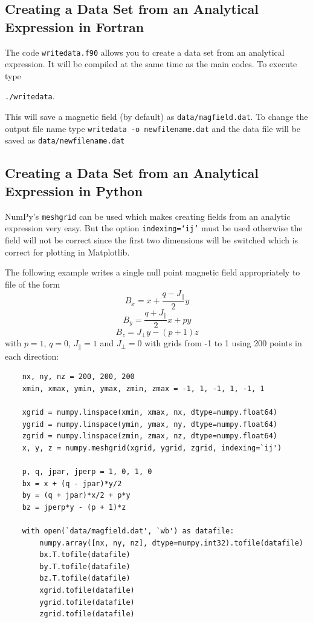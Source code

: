 \documentclass[12pt]{article}
\begin{document}
    \subsection{Creating a Data Set from an Analytical Expression in Fortran}
      \label{sec:writedata}

      The code \texttt{writedata.f90} allows you to create a data set from an analytical expression. It will be compiled at the same time as the main codes. To execute type

      \texttt{./writedata}.

      This will save a magnetic field (by default) as \texttt{data/magfield.dat}. To change the output file name type \texttt{writedata -o newfilename.dat} and the data file will be saved as \texttt{data/newfilename.dat}

    \subsection{Creating a Data Set from an Analytical Expression in Python}
      \label{sec:pythonanal}

      NumPy's \texttt{meshgrid} can be used which makes creating fields from an analytic expression very easy. But the option \texttt{indexing=`ij'} must be used otherwise the field will not be correct since the first two dimensions will be switched which is correct for plotting in Matplotlib.

      The following example writes a single null point magnetic field appropriately to file of the form
        \[ B_x = x + \frac{q - J_\parallel}{2} y \]
        \[ B_y = \frac{q + J_\parallel}{2} x + p y \]
        \[ B_z = J_\perp y - (p + 1) z \]
      with \( p = 1 \), \( q = 0 \), \( J_\parallel = 1 \) and \( J_\perp = 0 \) with grids from -1 to 1 using 200 points in each direction:

      \begin{verbatim}
    nx, ny, nz = 200, 200, 200
    xmin, xmax, ymin, ymax, zmin, zmax = -1, 1, -1, 1, -1, 1

    xgrid = numpy.linspace(xmin, xmax, nx, dtype=numpy.float64)
    ygrid = numpy.linspace(ymin, ymax, ny, dtype=numpy.float64)
    zgrid = numpy.linspace(zmin, zmax, nz, dtype=numpy.float64)
    x, y, z = numpy.meshgrid(xgrid, ygrid, zgrid, indexing=`ij')

    p, q, jpar, jperp = 1, 0, 1, 0
    bx = x + (q - jpar)*y/2
    by = (q + jpar)*x/2 + p*y
    bz = jperp*y - (p + 1)*z

    with open(`data/magfield.dat', `wb') as datafile:
        numpy.array([nx, ny, nz], dtype=numpy.int32).tofile(datafile)
        bx.T.tofile(datafile)
        by.T.tofile(datafile)
        bz.T.tofile(datafile)
        xgrid.tofile(datafile)
        ygrid.tofile(datafile)
        zgrid.tofile(datafile)
      \end{verbatim}
\end{document}
